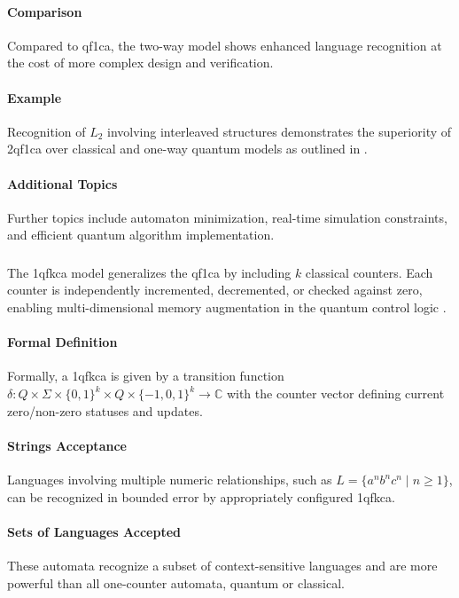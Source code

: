 \paragraph{Comparison}
Compared to \gls{qf1ca}, the two-way model shows enhanced language recognition at the cost of more complex design and verification.

\paragraph{Example}
Recognition of $L_2$ involving interleaved structures demonstrates the superiority of \gls{2qf1ca} over classical and one-way quantum models as outlined in \cite{bonner2001quantum}.

\paragraph{Additional Topics}
Further topics include automaton minimization, real-time simulation constraints, and efficient quantum algorithm implementation.

\subsubsection{}

The \gls{1qfkca} model generalizes the \gls{qf1ca} by including $k$ classical counters. Each counter is independently incremented, decremented, or checked against zero, enabling multi-dimensional memory augmentation in the quantum control logic \cite{cem2012quantum}.

\paragraph{Formal Definition}
Formally, a \gls{1qfkca} is given by a transition function $\delta: Q \times \Sigma \times \{0,1\}^k \times Q \times \{-1,0,1\}^k \rightarrow \mathbb{C}$ with the counter vector defining current zero/non-zero statuses and updates.

\paragraph{Strings Acceptance}
Languages involving multiple numeric relationships, such as $L = \{ a^n b^n c^n \mid n \geq 1 \}$, can be recognized in bounded error by appropriately configured \gls{1qfkca}.

\paragraph{Sets of Languages Accepted}
These automata recognize a subset of context-sensitive languages and are more powerful than all one-counter automata, quantum or classical.

